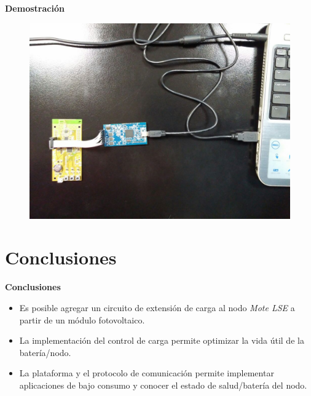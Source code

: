 \documentclass[aspectratio=43, handout]{beamer}
\begin{document}
\begin{frame}{\textbf{\LARGE{Demostración}}}
\begin{center}
		\begin{figure}[H]
			{\includegraphics[width=.9\textwidth]{./imagenes/debu.jpg}}
		\end{figure}	  
\end{center}	 	  	
\end{frame}

\section{Conclusiones}
\begin{frame}{\textbf{\LARGE{Conclusiones}}}
\fontsize{15pt}{15}\selectfont
\begin{itemize}
			\item Es posible agregar un circuito de extensión de carga al nodo \textit{Mote LSE} a partir de un módulo fotovoltaico.
					\vspace{10px}
			\item La implementación del control de carga permite optimizar la vida útil de la batería/nodo.
					\vspace{10px}
			\item La plataforma y el protocolo de comunicación permite implementar aplicaciones de bajo consumo y conocer el estado de salud/batería del nodo.
		\end{itemize}	  	
\end{frame}
\end{document}
